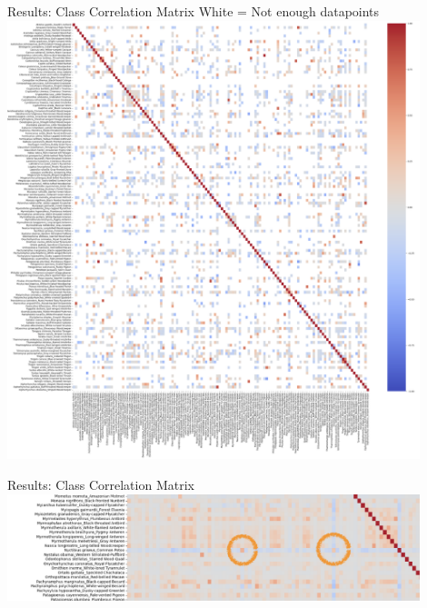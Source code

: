 \begin{frame}{Results: Class Correlation Matrix}
    \centering
    White = Not enough datapoints
    \\
    \centering
    \includegraphics[height=0.9\textheight,width=0.9\textwidth,keepaspectratio]{images/occurance_filter.png}
\end{frame}

\begin{frame}{Results: Class Correlation Matrix}
    \centering
    \includegraphics[height=0.9\textheight,width=0.9\textwidth,keepaspectratio]{images/night.png}
\end{frame}

